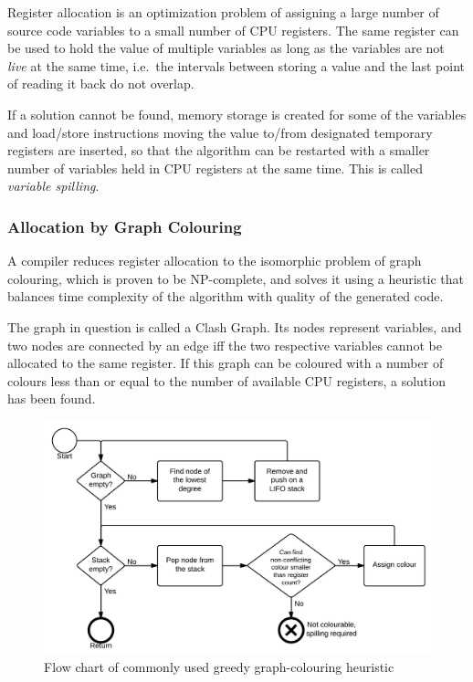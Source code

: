 \documentclass[12pt,twoside,notitlepage]{report}
\begin{document}
Register allocation is an optimization problem of assigning a large number of source code variables to a small number of CPU registers. The same register can be used to hold the value of multiple variables as long as the variables are not \emph{live} at the same time, i.e.\ the intervals between storing a value and the last point of reading it back do not overlap. 

If a solution cannot be found, memory storage is created for some of the variables and load/store instructions moving the value to/from designated temporary registers are inserted, so that the algorithm can be restarted with a smaller number of variables held in CPU registers at the same time. This is called \emph{variable spilling}.

\subsubsection{Allocation by Graph Colouring}

A compiler reduces register allocation to the isomorphic problem of graph colouring, which is proven to be NP-complete, and solves it using a heuristic that balances time complexity of the algorithm with quality of the generated code. 

The graph in question is called a Clash Graph. Its nodes represent variables, and two nodes are connected by an edge iff the two respective variables cannot be allocated to the same register. If this graph can be coloured with a number of colours less than or equal to the number of available CPU registers, a solution has been found. 

\begin{figure}[t]
	\centerline{	
		\includegraphics[width=\textwidth]{figs/fig_implementation_gc.png}
	}
	\caption{Flow chart of commonly used greedy graph-colouring heuristic}
	\label{fig:Implementation_GraphColouring}
\end{figure}
\end{document}
